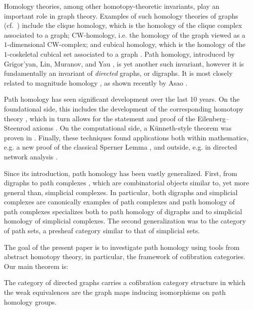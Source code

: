 \documentclass[11pt]{article}
\theoremstyle{definition}
\numberwithin{equation}{section}
\begin{document}
Homology theories, among other homotopy-theoretic invariants, play an important role in graph theory.
Examples of such homology theories of graphs (cf.~\cite[\S2.4]{barcelo-greene-jarraj-welker:discrete-path}) include the clique homology, which is the homology of the clique complex associated to a graph; CW-homology, i.e. the homology of the graph viewed as a $1$-dimensional CW-complex; and cubical homology, which is the homology of the $1$-coskeletal cubical set associated to a graph \cite{barcelo-capraro-white}.
Path homology, introduced by Grigor'yan, Lin, Muranov, and Yau \cite{grigor'yan-lin-muranov-yau:unpublished}, is yet another such invariant, however it is fundamentally an invariant of \emph{directed} graphs, or digraphs.
It is most closely related to magnitude homology \cite{hepworth-willerton}, as shown recently by Asao \cite{asao:magnitude-n-path}.

Path homology has seen significant development over the last 10 years.
On the foundational side, this includes the development of the corresponding homotopy theory \cite{grigor'yan-lin-muranov-yau:homotopy}, which in turn allows for the statement and proof of the Eilenberg--Steenrod axioms \cite{grigor'yan-jimenez-muranov-yau}.
On the computational side, a K{\"u}nneth-style theorem was proven in \cite{grigor'yan-muranov-yau}.
Finally, these techniques found applications both within mathematics, e.g. a new proof of the classical Sperner Lemma \cite[\S5]{grigor'yan-lin-muranov-yau:homotopy}, and outside, e.g. in directed network analysis \cite{chowdhury-memoli,chowdhury}.

Since its introduction, path homology has been vastly generalized.
First, from digraphs to path complexes \cite{grigor'yan-lin-muranov-yau}, which are combinatorial objects similar to, yet more general than, simplicial complexes.
In particular, both digraphs and simplicial complexes are canonically examples of path complexes and path homology of path complexes specializes both to path homology of digraphs and to simplicial homology of simplicial complexes.
The second generalization \cite{ivanov-pavutniskiy} was to the category of path sets, a presheaf category similar to that of simplicial sets.

The goal of the present paper is to investigate path homology using tools from abstract homotopy theory, in particular, the framework of cofibration categories.
Our main theorem is:

\begin{theorem*}
  The category of directed graphs carries a cofibration category structure in which the weak equivalences are the graph maps inducing isomorphisms on path homology groups.
\end{theorem*}
\end{document}
